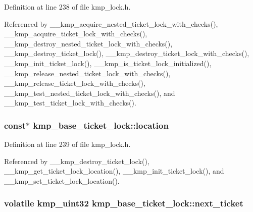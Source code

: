 Definition at line 238 of file kmp\-\_\-lock.\-h.



Referenced by \-\_\-\-\_\-kmp\-\_\-acquire\-\_\-nested\-\_\-ticket\-\_\-lock\-\_\-with\-\_\-checks(), \-\_\-\-\_\-kmp\-\_\-acquire\-\_\-ticket\-\_\-lock\-\_\-with\-\_\-checks(), \-\_\-\-\_\-kmp\-\_\-destroy\-\_\-nested\-\_\-ticket\-\_\-lock\-\_\-with\-\_\-checks(), \-\_\-\-\_\-kmp\-\_\-destroy\-\_\-ticket\-\_\-lock(), \-\_\-\-\_\-kmp\-\_\-destroy\-\_\-ticket\-\_\-lock\-\_\-with\-\_\-checks(), \-\_\-\-\_\-kmp\-\_\-init\-\_\-ticket\-\_\-lock(), \-\_\-\-\_\-kmp\-\_\-is\-\_\-ticket\-\_\-lock\-\_\-initialized(), \-\_\-\-\_\-kmp\-\_\-release\-\_\-nested\-\_\-ticket\-\_\-lock\-\_\-with\-\_\-checks(), \-\_\-\-\_\-kmp\-\_\-release\-\_\-ticket\-\_\-lock\-\_\-with\-\_\-checks(), \-\_\-\-\_\-kmp\-\_\-test\-\_\-nested\-\_\-ticket\-\_\-lock\-\_\-with\-\_\-checks(), and \-\_\-\-\_\-kmp\-\_\-test\-\_\-ticket\-\_\-lock\-\_\-with\-\_\-checks().

\hypertarget{structkmp__base__ticket__lock_a0dba998d5ca5ad3494098a70ee5d067e}{
\subsubsection[{location}]{ const$\ast$ kmp\-\_\-base\-\_\-ticket\-\_\-lock\-::location}}\label{structkmp__base__ticket__lock_a0dba998d5ca5ad3494098a70ee5d067e}


Definition at line 239 of file kmp\-\_\-lock.\-h.



Referenced by \-\_\-\-\_\-kmp\-\_\-destroy\-\_\-ticket\-\_\-lock(), \-\_\-\-\_\-kmp\-\_\-get\-\_\-ticket\-\_\-lock\-\_\-location(), \-\_\-\-\_\-kmp\-\_\-init\-\_\-ticket\-\_\-lock(), and \-\_\-\-\_\-kmp\-\_\-set\-\_\-ticket\-\_\-lock\-\_\-location().

\hypertarget{structkmp__base__ticket__lock_a5d8979535f7e42b2ab96100564315a98}{
\subsubsection[{next\-\_\-ticket}]{\setlength{\rightskip}{0pt plus 5cm}volatile kmp\-\_\-uint32 kmp\-\_\-base\-\_\-ticket\-\_\-lock\-::next\-\_\-ticket}}\label{structkmp__base__ticket__lock_a5d8979535f7e42b2ab96100564315a98}


